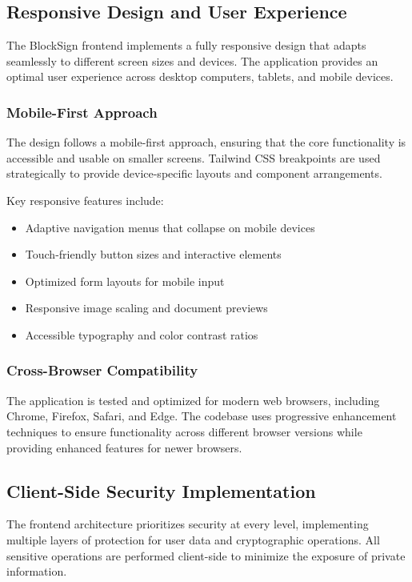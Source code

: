 \subsection{Responsive Design and User Experience}
The BlockSign frontend implements a fully responsive design that adapts seamlessly to different screen sizes and devices. The application provides an optimal user experience across desktop computers, tablets, and mobile devices.

\subsubsection{Mobile-First Approach}
The design follows a mobile-first approach, ensuring that the core functionality is accessible and usable on smaller screens. Tailwind CSS breakpoints are used strategically to provide device-specific layouts and component arrangements.

Key responsive features include:
\begin{itemize}
    \item Adaptive navigation menus that collapse on mobile devices
    \item Touch-friendly button sizes and interactive elements
    \item Optimized form layouts for mobile input
    \item Responsive image scaling and document previews
    \item Accessible typography and color contrast ratios
\end{itemize}

\subsubsection{Cross-Browser Compatibility}
The application is tested and optimized for modern web browsers, including Chrome, Firefox, Safari, and Edge. The codebase uses progressive enhancement techniques to ensure functionality across different browser versions while providing enhanced features for newer browsers.

\subsection{Client-Side Security Implementation}
The frontend architecture prioritizes security at every level, implementing multiple layers of protection for user data and cryptographic operations. All sensitive operations are performed client-side to minimize the exposure of private information.

